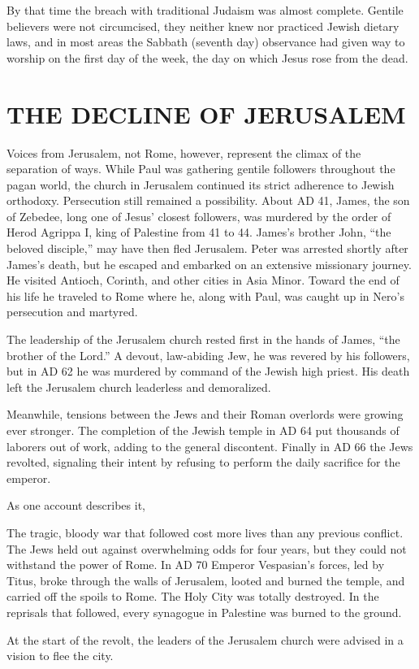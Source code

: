 By that time the breach with traditional Judaism was almost complete. Gentile believers were not
circumcised, they neither knew nor practiced Jewish dietary laws, and in most areas the Sabbath
(seventh day) observance had given way to worship on the first day of the week, the day on which
Jesus rose from the dead.

\section{THE DECLINE OF JERUSALEM}

Voices from Jerusalem, not Rome, however, represent the climax of the separation of ways. While Paul
was gathering gentile followers throughout the pagan world, the church in Jerusalem continued its
strict adherence to Jewish orthodoxy. Persecution still remained a possibility. About AD 41, James,
the son of Zebedee, long one of Jesus’ closest followers, was murdered by the order of Herod Agrippa
I, king of Palestine from 41 to 44. James’s brother John, “the beloved disciple,” may have then fled
Jerusalem. Peter was arrested shortly after James’s death, but he escaped and embarked on an
extensive missionary journey. He visited Antioch, Corinth, and other cities in Asia Minor. Toward
the end of his life he traveled to Rome where he, along with Paul, was caught up in Nero’s
persecution and martyred.

The leadership of the Jerusalem church rested first in the hands of James, “the brother of the
Lord.” A devout, law-abiding Jew, he was revered by his followers, but in AD 62 he was murdered by
command of the Jewish high priest. His death left the Jerusalem church leaderless and demoralized.

Meanwhile, tensions between the Jews and their Roman overlords were growing ever stronger. The
completion of the Jewish temple in AD 64 put thousands of laborers out of work, adding to the
general discontent. Finally in AD 66 the Jews revolted, signaling their intent by refusing to
perform the daily sacrifice for the emperor.

As one account describes it,

\begin{blockquote}
The tragic, bloody war that followed cost more lives than any previous conflict. The Jews held out
against overwhelming odds for four years, but they could not withstand the power of Rome. In AD 70
Emperor Vespasian’s forces, led by Titus, broke through the walls of Jerusalem, looted and burned
the temple, and carried off the spoils to Rome. The Holy City was totally destroyed. In the
reprisals that followed, every synagogue in Palestine was burned to the ground.

At the start of the revolt, the leaders of the Jerusalem church were advised in a vision to flee the
city.
\end{blockquote}

